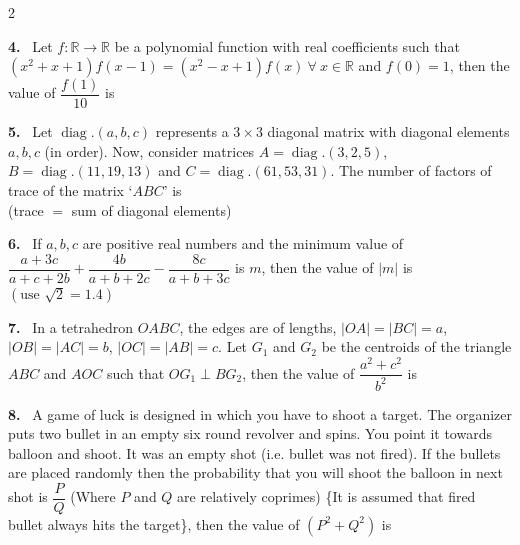 \documentclass[10pt]{extarticle}
\newcommand{\qn}[1]{\par\smallskip\noindent\textbf{#1.}~}
\begin{document}
\begin{multicols}{2}
\qn{4} Let $f:\mathbb R\to\mathbb R$ be a polynomial function with real coefficients such that $(x^2+x+1)f(x-1)=(x^2-x+1)f(x)\ \forall\ x\in\mathbb R$ and $f(0)=1$, then the value of $\dfrac{f(1)}{10}$ is
\qn{5} Let $\operatorname{diag}.(a,b,c)$ represents a $3\times3$ diagonal matrix with diagonal elements $a,b,c$ (in order). Now, consider matrices $A=\operatorname{diag}.(3,2,5)$, $B=\operatorname{diag}.(11,19,13)$ and $C=\operatorname{diag}.(61,53,31)$. The number of factors of trace of the matrix `$ABC$' is\\
(trace $=$ sum of diagonal elements)
\qn{6} If $a,b,c$ are positive real numbers and the minimum value of $\dfrac{a+3c}{a+c+2b}+\dfrac{4b}{a+b+2c}-\dfrac{8c}{a+b+3c}$ is $m$, then the value of $|m|$ is $(\text{use }\sqrt2=1.4)$
\qn{7} In a tetrahedron $OABC$, the edges are of lengths, $|OA|=|BC|=a$, $|OB|=|AC|=b$, $|OC|=|AB|=c$. Let $G_1$ and $G_2$ be the centroids of the triangle $ABC$ and $AOC$ such that $OG_1\perp BG_2$, then the value of $\dfrac{a^2+c^2}{b^2}$ is
\qn{8} A game of luck is designed in which you have to shoot a target. The organizer puts two bullet in an empty six round revolver and spins. You point it towards balloon and shoot. It was an empty shot (i.e. bullet was not fired). If the bullets are placed randomly then the probability that you will shoot the balloon in next shot is $\dfrac PQ$ (Where $P$ and $Q$ are relatively coprimes) \{It is assumed that fired bullet always hits the target\}, then the value of $(P^2+Q^2)$ is
\end{multicols}
\end{document}
